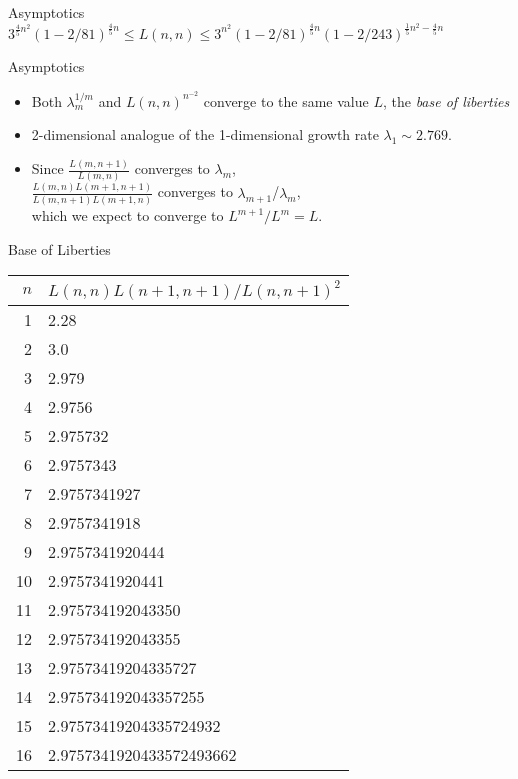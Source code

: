 \documentclass{prosper}
\begin{document}
\begin{slide}{Asymptotics}
{\epsfxsize=9cm } \\
$3^{\frac{4}{5}n^2}(1-2/81)^{\frac{4}{5}n} \leq L(n,n) \leq 3^{ n^2  }(1-2/81)^{\frac{4}{5}n}(1-2/243)^{\frac{1}{5}n^2-\frac{4}{5}n}$
\end{slide}

\begin{slide}{Asymptotics}
\begin{itemize}
\item
Both $\lambda_m^{1/m}$ and $L(n,n)^{n^{-2}}$ converge to the same
value $L$, the {\em base of liberties}
\item
2-dimensional analogue of the
1-dimensional growth rate $\lambda_1 \sim 2.769$.
\item
Since $\frac{L(m,n+1)}{L(m,n)}$ converges to $\lambda_m$, \\
$\frac{L(m,n)L(m+1,n+1)}{L(m,n+1)L(m+1,n)}$ converges to
$\lambda_{m+1}$/$\lambda_m$, \\
which we expect to converge to $L^{m+1}/L^m=L$.
\end{itemize}
\end{slide}

\begin{slide}{Base of Liberties}
\tiny
\begin{table}
\begin{center}
\begin{tabular}{|r|l|}
\hline
$n$ & $L(n,n)L(n+1,n+1)/L(n,n+1)^2$ \\ \hline
1   & 2.28 \\
2   & 3.0 \\
3   & 2.979 \\
4   & 2.9756 \\
5   & 2.975732 \\
6   & 2.9757343 \\
7   & 2.9757341927 \\
8   & 2.9757341918 \\
9   & 2.9757341920444 \\
10  & 2.9757341920441 \\
11  & 2.975734192043350 \\
12  & 2.975734192043355 \\
13  & 2.97573419204335727 \\
14  & 2.975734192043357255 \\
15  & 2.97573419204335724932 \\
16  & 2.9757341920433572493662 \\
\hline
\end{tabular}
\end{center}
\end{table}
\end{slide}
\end{document}
